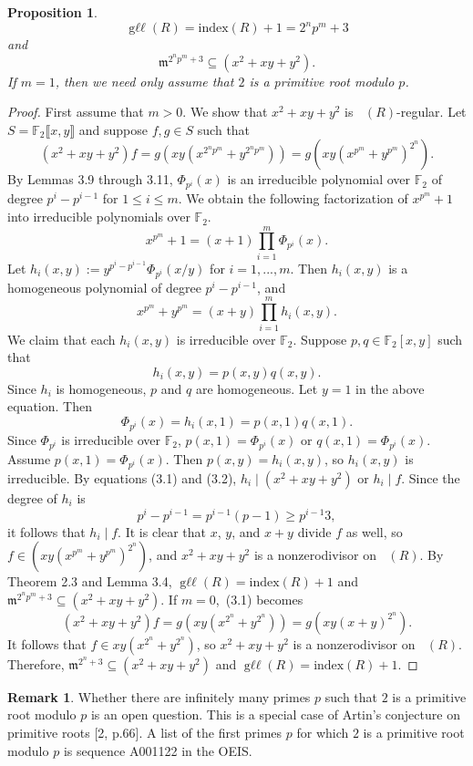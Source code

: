 \documentclass{amsart}
\newtheorem{proposition}[theorem]{Proposition}
\theoremstyle{definition}
\theoremstyle{definition}
\newtheorem{remark}[theorem]{Remark}
\DeclareMathOperator{\gr}{\text{gr}_{\mathfrak{m}}}
\DeclareMathOperator{\gll}{\text{g}\ell\ell}
\numberwithin{equation}{section}
\theoremstyle{definition}
\begin{document}
{\begin{proposition}
\[\gll(R)=\text{index}(R)+1=2^{n}p^{m}+3
\]\text{}
and \[\mathfrak{m}^{2^{n}p^{m}+3} \subseteq (x^2+xy+y^2).
\]\text{}\newline If $m=1$, then we need only assume that $2$ is a primitive root modulo $p$. \end{proposition}\begin{proof} First assume that $m>0$. We show that $x^2+xy+y^2$ is $\gr(R)$-regular. Let $S=\mathbb{F}_{2}\llbracket x,y \rrbracket$ and suppose $f,g \in S$ such that \newline \begin{equation} (x^2+xy+y^2)f=g(xy(x^{2^{n}p^{m}}+y^{2^{n}p^{m}}))=g(xy(x^{p^{m}}+y^{p^{m}})^{2^{n}}). \end{equation}\text{}\newline By Lemmas 3.9 through 3.11, $\Phi_{p^{i}}(x)$ is an irreducible polynomial over $\mathbb{F}_{2}$ of degree $p^{i}-p^{i-1}$ for $1 \leq i \leq m$. We obtain the following factorization of $x^{p^{m}}+1$ into irreducible polynomials over $\mathbb{F}_{2}$. 
\[x^{p^{m}}+1=(x+1)\prod\limits_{i=1}^{m}\Phi_{p^{i}}(x).
\] Let $h_{i}(x,y):=y^{p^{i}-p^{i-1}}\Phi_{p^{i}}(x/y)$ for $i=1,...,m$. Then $h_{i}(x,y)$ is a homogeneous polynomial of degree $p^{i}-p^{i-1}$, and \begin{equation} x^{p^{m}}+y^{p^{m}}=(x+y)\prod\limits_{i=1}^{m}h_{i}(x,y).\end{equation}\text{} We claim that each $h_{i}(x,y)$ is irreducible over $\mathbb{F}_{2}$. Suppose $p,q \in \mathbb{F}_{2}[x,y]$ such that 
\[
h_{i}(x,y)=p(x,y)q(x,y). 
\] 
Since $h_{i}$ is homogeneous, $p$ and $q$ are homogeneous. Let $y=1$ in the above equation. Then  
\[
\Phi_{p^{i}}(x)=h_{i}(x,1)=p(x,1)q(x,1). 
\]
Since $\Phi_{p^{i}}$ is irreducible over $\mathbb{F}_{2}$, $p(x,1)=\Phi_{p^{i}}(x)$ or $q(x,1)=\Phi_{p^{i}}(x)$. Assume $p(x,1)=\Phi_{p^{i}}(x)$. Then $p(x,y)=h_{i}(x,y)$, so $h_{i}(x,y)$ is irreducible. By equations (3.1) and (3.2), $h_{i} \mid (x^2+xy+y^2)$ or $h_{i} \mid f$. Since the degree of $h_{i}$ is 
\[
p^{i}-p^{i-1}=p^{i-1}(p-1) \geq p^{i-1}3, 
\]
it follows that $h_{i} \mid f$. It is clear that $x$, $y$, and $x+y$ divide $f$ as well, so $f \in (xy(x^{p^{m}}+y^{p^{m}})^{2^{n}})$, and $x^2+xy+y^2$ is a nonzerodivisor on $\gr(R)$. By Theorem 2.3 and Lemma 3.4, $\gll(R) = \text{index}(R)+1$ and $\mathfrak{m}^{2^{n}p^{m}+3} \subseteq (x^2+xy+y^2)$. If $m=0$, \,(3.1) becomes 
\[(x^2+xy+y^2)f=g(xy(x^{2^{n}}+y^{2^{n}}))=g(xy(x+y)^{2^{n}}).
\]\text{}It follows that $f \in xy(x^{2^{n}}+y^{2^{n}})$, so $x^2+xy+y^2$ is a nonzerodivisor on $\gr(R)$. Therefore, $\mathfrak{m}^{2^{n}+3} \subseteq (x^2+xy+y^2)$ and $\gll(R) = \text{index}(R)+1$.  \end{proof}\text{}
\begin{remark} Whether there are infinitely many primes $p$ such that $2$ is a primitive root modulo $p$ is an open question. This is a special case of Artin's conjecture on primitive roots [2, p.66]. A list of the first primes $p$ for which $2$ is a primitive root modulo $p$ is sequence A001122 in the OEIS.
\end{remark}\text{} 
}
\end{document}
